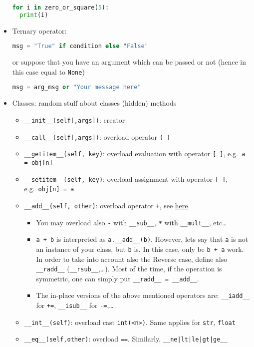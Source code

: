 \documentclass[a4paper,12pt,%
              final%
              ]{article}
\begin{document}
\begin{itemize}
\begin{lstlisting}[language=python]
for i in zero_or_square(5):
  print(i)
\end{lstlisting}
  \item Ternary operator:
\begin{lstlisting}[language=python]
msg = "True" if condition else "False"
\end{lstlisting}
    or suppose that you have an argument which can be passed or not (hence in this case equal to \verb|None|)
\begin{lstlisting}[language=python]
msg = arg_msg or "Your message here"
\end{lstlisting}
  \item Classes: random stuff about classes (hidden) methods
    \begin{itemize}
      \item \verb|__init__(self[,args])|: creator
      \item \verb|__call__(self[,args])|: overload operator \verb|( )|
      \item \verb|__getitem__(self, key)|: overload evaluation with operator \verb|[ ]|, e.g.~\verb|a = obj[n]|
      \item \verb|__setitem__(self, key)|: overload assignment with operator \verb|[ ]|, e.g.~\verb|obj[n] = a|
      \item \verb|__add__(self, other)|: overload operator \verb|+|, see \href{https://docs.python.org/3/reference/datamodel.html#emulating-numeric-types}{here}.
        \begin{itemize}
          \item You may overload also \verb|-| with \verb|__sub__|, \texttt{*} with \verb|__mult__|, etc\ldots
          \item \verb|a + b| is interpreted as \verb|a.__add__(b)|. However, lets say that \texttt{a} is not an instance of your class, but \verb|b| is. In this case, only be \verb|b + a| work. In order to take into account also the Reverse case, define also \verb|__radd__| (\verb|__rsub__|,\ldots). Most of the time, if the operation is symmetric, one can simply put \verb|__radd__ = __add__|.
          \item The in-place versions of the above mentioned operators are: \verb|__iadd__| for \verb|+=|, \verb|__isub__| for \verb|-=|,\ldots
        \end{itemize}
      \item \verb|__int__(self)|: overload cast \verb|int(<n>)|. Same applies for \verb|str|, \verb|float|
      \item \verb|__eq__(self,other)|: overload \verb|==|. Similarly, \verb!__ne|lt|le|gt|ge__!

\end{itemize}
\end{itemize}
\end{document}
